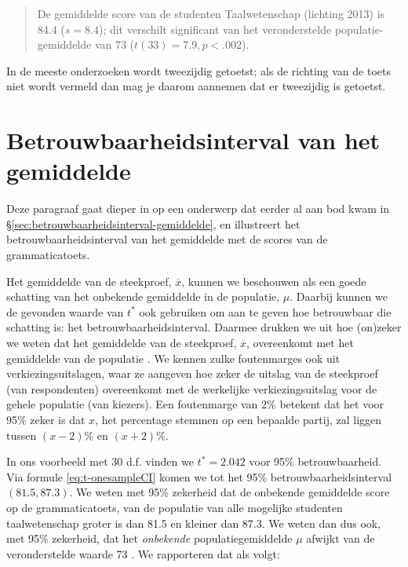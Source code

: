 \documentclass[
]{book}
\begin{document}
\begin{quote}
De gemiddelde score van de studenten Taalwetenschap (lichting 2013) is
84.4 (\(s=8.4\)); dit verschilt significant van het veronderstelde
populatie-gemiddelde van 73 (\(t(33)=7.9, p<.002\)).
\end{quote}

In de meeste onderzoeken wordt tweezijdig getoetst; als de richting van
de toets niet wordt vermeld dan mag je daarom aannemen dat er tweezijdig
is getoetst.

\hypertarget{sec:t-betrouwbaarheidsinterval-gemiddelde}{%
\section{Betrouwbaarheidsinterval van het gemiddelde}\label{sec:t-betrouwbaarheidsinterval-gemiddelde}}

Deze paragraaf gaat dieper in op een onderwerp dat eerder al aan bod kwam in §\ref{sec:betrouwbaarheidsinterval-gemiddelde}, en illustreert het betrouwbaarheidsinterval van het gemiddelde met de scores van de grammaticatoets.

Het gemiddelde van de steekproef, \(\overline{x}\), kunnen we beschouwen
als een goede schatting van het onbekende gemiddelde in de populatie,
\(\mu\). Daarbij kunnen we de gevonden waarde van \(t^*\) ook gebruiken om
aan te geven hoe betrouwbaar die schatting is: het
betrouwbaarheidsinterval. Daarmee drukken we uit hoe (on)zeker we weten
dat het gemiddelde van de steekproef, \(\overline{x}\), overeenkomt met
het gemiddelde van de populatie \citep{Cumm12}. We kennen zulke foutenmarges
ook uit verkiezingsuitslagen, waar ze aangeven hoe zeker de uitslag van
de steekproef (van respondenten) overeenkomt met de werkelijke
verkiezingsuitslag voor de gehele populatie (van kiezers). Een
foutenmarge van 2\% betekent dat het voor 95\% zeker is dat \(x\), het
percentage stemmen op een bepaalde partij, zal liggen tussen \((x-2)\)\% en
\((x+2)\)\%.

In ons voorbeeld met 30 d.f. vinden we \(t^*=2.042\) voor 95\%
betrouwbaarheid. Via formule
\eqref{eq:t-onesampleCI} komen we tot het 95\%
betrouwbaarheidsinterval \((81.5, 87.3)\). We weten met 95\% zekerheid dat
de onbekende gemiddelde score op de grammaticatoets, van de populatie
van alle mogelijke studenten taalwetenschap groter is dan 81.5 en
kleiner dan 87.3. We weten dan dus ook, met 95\% zekerheid, dat het
\emph{onbekende} populatiegemiddelde \(\mu\) afwijkt van de veronderstelde
waarde 73 \citep{Cumm12}. We rapporteren dat als volgt:
\end{document}
